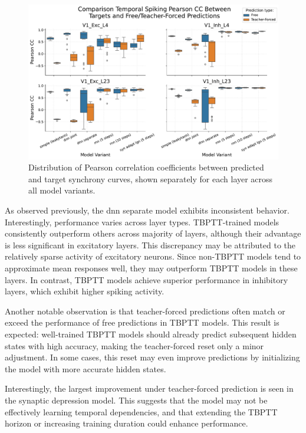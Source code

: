\begin{figure}
    \centering
    \includegraphics[width=\linewidth]{img/plots/boxplot_model_comparison_synchrony_pearson_layers.pdf}
    \caption{Distribution of Pearson correlation coefficients between predicted and target synchrony curves, shown separately for each layer across all model variants.}
    \label{fig:boxplot_models_pearson_synchrony_different_layers}
\end{figure}

As observed previously, the dnn separate model exhibits inconsistent behavior. Interestingly, performance varies across layer types. TBPTT-trained models consistently outperform others across majority of layers, although their advantage is less significant in excitatory layers. This discrepancy may be attributed to the relatively sparse activity of excitatory neurons. Since non-TBPTT models tend to approximate mean responses well, they may outperform TBPTT models in these layers. In contrast, TBPTT models achieve superior performance in inhibitory layers, which exhibit higher spiking activity.

Another notable observation is that teacher-forced predictions often match or exceed the performance of free predictions in TBPTT models. This result is expected: well-trained TBPTT models should already predict subsequent hidden states with high accuracy, making the teacher-forced reset only a minor adjustment. In some cases, this reset may even improve predictions by initializing the model with more accurate hidden states.

Interestingly, the largest improvement under teacher-forced prediction is seen in the synaptic depression model. This suggests that the model may not be effectively learning temporal dependencies, and that extending the TBPTT horizon or increasing training duration could enhance performance.

